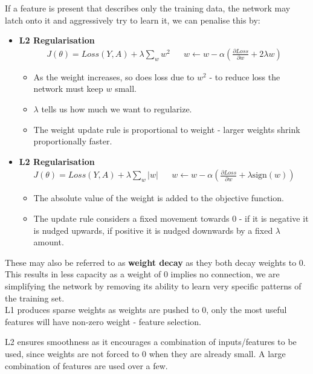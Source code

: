 \documentclass[11pt]{article}
\begin{document}
If a feature is present that describes only the training data, the network may latch onto it and aggressively try to learn it, we can penalise this by:
\begin{itemize}
  \item \textbf{L2 Regularisation}
    \begin{align*}
      J(\theta) = Loss(Y, A) + \lambda \sum_w w^2 &&
      w \leftarrow w - \alpha \left( \frac{\partial Loss}{\partial w} + 2 \lambda w \right)
    \end{align*}
    \begin{itemize}
      \item As the weight increases, so does loss due to $w^2$ - to reduce loss the network must keep $w$ small.
      \item $\lambda$ tells us how much we want to regularize.
      \item The weight update rule is proportional to weight - larger weights shrink proportionally faster.
    \end{itemize}
  \item \textbf{L2 Regularisation}
    \begin{align*}
      J(\theta) = Loss(Y, A) + \lambda \sum_w \lvert w \rvert &&
      w \leftarrow w - \alpha \left( \frac{\partial Loss}{\partial w} + \lambda \text{sign}(w) \right)
    \end{align*}
    \begin{itemize}
      \item The absolute value of the weight is added to the objective function.
      \item The update rule considers a fixed movement towards 0 - if it is negative it is nudged upwards, if positive it is nudged downwards by a fixed $\lambda$ amount.
    \end{itemize}
\end{itemize}
These may also be referred to as \textbf{weight decay} as they both decay weights to 0.
This results in less capacity as a weight of 0 implies no connection, we are simplifying the network by removing its ability to learn very specific patterns of the training set. \\

L1 produces sparse weights as weights are pushed to 0, only the most useful features will have non-zero weight - feature selection.

L2 ensures smoothness as it encourages a combination of inputs/features to be used, since weights are not forced to 0 when they are already small.
A large combination of features are used over a few.
\end{document}
